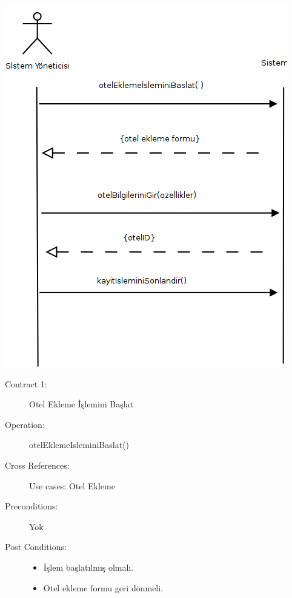 \documentclass[12pt,a4paper]{report}
\begin{document}
\newpage

\begin{center}
\includegraphics{dia/ssd-usecase4.png}
\end{center}

\newpage

\begin{description}
\item[Contract 1:] Otel Ekleme İşlemini Başlat
\item[Operation:] otelEklemeIsleminiBaslat()
\item[Cross References:] Use cases: Otel Ekleme
\item[Preconditions:] Yok
\item[Post Conditions:] \hspace{10 mm}
\begin{itemize} 
\item İşlem başlatılmış olmalı.
\item Otel ekleme formu geri dönmeli. \\
\end{itemize}
\end{description}
\end{document}
